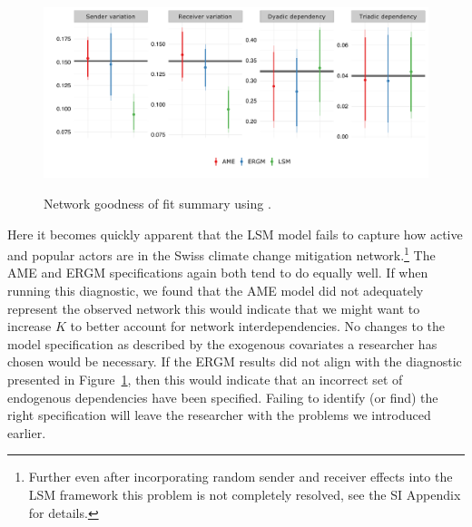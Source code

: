 \begin{figure}[ht]
	\centering
	\caption{Network goodness of fit summary using .}
	\includegraphics[width=1\textwidth]{netPerfCoef}
	\label{fig:ergmAmePerf}
\end{figure}
\FloatBarrier

Here it becomes quickly apparent that the LSM model fails to capture how active and popular actors are in the Swiss climate change mitigation network.\footnote{Further even after incorporating random sender and receiver effects into the LSM framework this problem is not completely resolved, see the SI Appendix for details.} The AME and ERGM specifications again both tend to do equally well. If when running this diagnostic, we found that the AME model did not adequately represent the observed network this would indicate that we might want to increase $K$ to better account for network interdependencies. No changes to the model specification as described by the exogenous covariates a researcher has chosen would be necessary. If the ERGM results did not align with the diagnostic presented in Figure~\ref{fig:ergmAmePerf}, then this would indicate that an incorrect set of endogenous dependencies have been specified. Failing to identify (or find) the right specification will leave the researcher with the problems we introduced earlier.
